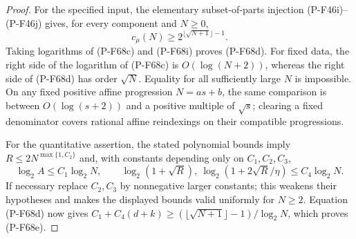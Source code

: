\begin{proof}
For the specified input, the elementary subset-of-parts injection
(P-F46i)--(P-F46j) gives, for every component and $N\ge0$,
\[
                  c_\mu(N)\ge 2^{\lfloor\sqrt{N+1}\rfloor-1}.
                                                        \tag{P-F68i}
\]
Taking logarithms of (P-F68c) and (P-F68i) proves (P-F68d).
For fixed data, the right side of the logarithm of (P-F68c) is
$O(\log(N+2))$, whereas the right side of (P-F68d) has order
$\sqrt N$.  Equality for all sufficiently large $N$ is impossible.
On any fixed positive affine progression $N=as+b$, the same
comparison is between $O(\log(s+2))$ and a positive multiple of
$\sqrt s$; clearing a fixed denominator covers rational affine
reindexings on their compatible progressions.

For the quantitative assertion, the stated polynomial bounds imply
$R\le2N^{\max\{1,C_2\}}$ and, with constants depending only on
$C_1,C_2,C_3$,
\[
 \log_2 A\le C_1\log_2N,\qquad
 \log_2(1+\sqrt R),\ \log_2(1+2\sqrt R/\eta)
                                            \le C_4\log_2N.
\]
If necessary replace $C_2,C_3$ by nonnegative larger constants;
this weakens their hypotheses and makes the displayed bounds valid
uniformly for $N\ge2$.  Equation (P-F68d) now gives
$C_1+C_4(d+k)\ge(\lfloor\sqrt{N+1}\rfloor-1)/\log_2N$,
which proves (P-F68e).
\end{proof}

